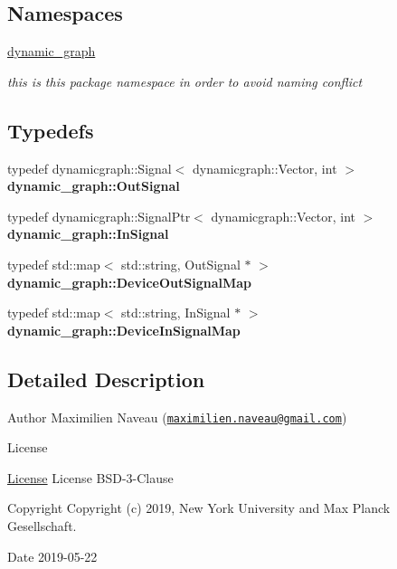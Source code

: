 \subsection*{Namespaces}
\begin{DoxyCompactItemize}
\item 
 \hyperlink{namespacedynamic__graph}{dynamic\+\_\+graph}
\begin{DoxyCompactList}\small\item\em this is this package namespace in order to avoid naming conflict \end{DoxyCompactList}\end{DoxyCompactItemize}
\subsection*{Typedefs}
\begin{DoxyCompactItemize}
\item 
\mbox{\label{namespacedynamic__graph_a9f7c2bba6c653b0b54f5daff8daa1195}} 
typedef dynamicgraph\+::\+Signal$<$ dynamicgraph\+::\+Vector, int $>$ {\bfseries dynamic\+\_\+graph\+::\+Out\+Signal}
\item 
\mbox{\label{namespacedynamic__graph_a739352a5fe7af6c341a822010fa06d1e}} 
typedef dynamicgraph\+::\+Signal\+Ptr$<$ dynamicgraph\+::\+Vector, int $>$ {\bfseries dynamic\+\_\+graph\+::\+In\+Signal}
\item 
\mbox{\label{namespacedynamic__graph_ae168c2ee7d976fe18dd9c7a63642dd48}} 
typedef std\+::map$<$ std\+::string, Out\+Signal $\ast$ $>$ {\bfseries dynamic\+\_\+graph\+::\+Device\+Out\+Signal\+Map}
\item 
\mbox{\label{namespacedynamic__graph_a96a57e0d53be372bae053f444016e171}} 
typedef std\+::map$<$ std\+::string, In\+Signal $\ast$ $>$ {\bfseries dynamic\+\_\+graph\+::\+Device\+In\+Signal\+Map}
\end{DoxyCompactItemize}


\subsection{Detailed Description}
\begin{DoxyAuthor}{Author}
Maximilien Naveau (\href{mailto:maximilien.naveau@gmail.com}{\tt maximilien.\+naveau@gmail.\+com}) 
\end{DoxyAuthor}
\begin{DoxyRefDesc}{License}
\item[\hyperlink{license__license000003}{License}]License B\+S\+D-\/3-\/\+Clause \end{DoxyRefDesc}
\begin{DoxyCopyright}{Copyright}
Copyright (c) 2019, New York University and Max Planck Gesellschaft. 
\end{DoxyCopyright}
\begin{DoxyDate}{Date}
2019-\/05-\/22 
\end{DoxyDate}
